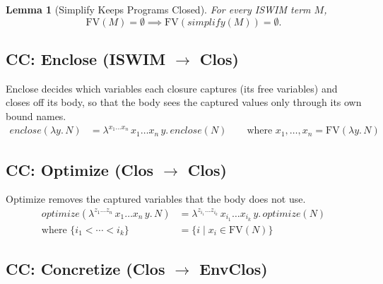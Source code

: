 \documentclass[10pt]{article}
\theoremstyle{acmplain}
\newtheorem{lemma}[theorem]{Lemma}
\newcommand{\pass}[1]{\mathit{#1}}
\newcommand{\lam}[1]{\lambda #1.\,}
\newcommand{\clos}[2]{\lambda^{#1}\, #2.\,}
\newcommand{\FV}{\mathrm{FV}}
\begin{document}
\begin{lemma}[Simplify Keeps Programs Closed]\label{lem:simplify-closed}
For every ISWIM term $M$,
\[
  \FV(M) = \emptyset \implies \FV(\pass{simplify}(M)) = \emptyset .
\]
\end{lemma}

\subsection{CC: Enclose (ISWIM \texorpdfstring{$\to$}{->} Clos)}

Enclose decides which variables each closure captures (its free variables) and closes off its body, so that the body sees the captured values only through its own bound names.
\begin{align*}
  \pass{enclose}(\lam{y} N) &= \clos{x_1\ldots x_n}{x_1\ldots x_n\, y} \pass{enclose}(N)
    \qquad\text{where } x_1, \ldots, x_n = \FV(\lam{y} N)
\end{align*}

\subsection{CC: Optimize (Clos \texorpdfstring{$\to$}{->} Clos)}

Optimize removes the captured variables that the body does not use.
\begin{align*}
  \pass{optimize}(\clos{z_1\ldots z_n}{x_1\ldots x_n\, y} N) &=
    \clos{z_{i_1}\ldots z_{i_k}}{x_{i_1}\ldots x_{i_k}\, y} \pass{optimize}(N) \\
  \text{where } \{ i_1 < \cdots < i_k \} &= \{ i \mid x_i \in \FV(N) \}
\end{align*}

\subsection{CC: Concretize (Clos \texorpdfstring{$\to$}{->} EnvClos)}
\end{document}
